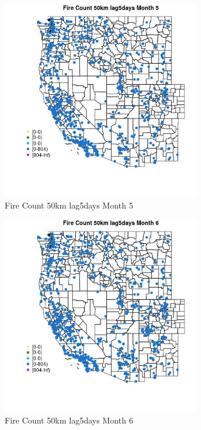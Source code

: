 \begin{figure} 
\centering  
\includegraphics[width=0.77\textwidth]{Code_Outputs/Report_ML_input_PM25_Step4_part_f_de_duplicated_aveswNAs_MapObsMo5Fire_Count_50km_lag5days.jpg} 
\caption{\label{fig:Report_ML_input_PM25_Step4_part_f_de_duplicated_aveswNAsMapObsMo5Fire_Count_50km_lag5days}Fire Count 50km lag5days Month 5} 
\end{figure} 
 

\clearpage 

\begin{figure} 
\centering  
\includegraphics[width=0.77\textwidth]{Code_Outputs/Report_ML_input_PM25_Step4_part_f_de_duplicated_aveswNAs_MapObsMo6Fire_Count_50km_lag5days.jpg} 
\caption{\label{fig:Report_ML_input_PM25_Step4_part_f_de_duplicated_aveswNAsMapObsMo6Fire_Count_50km_lag5days}Fire Count 50km lag5days Month 6} 
\end{figure} 
 

